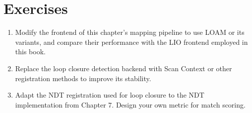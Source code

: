 \section*{Exercises}  
\begin{enumerate}  
	\item Modify the frontend of this chapter's mapping pipeline to use LOAM or its variants, and compare their performance with the LIO frontend employed in this book.  
	\item Replace the loop closure detection backend with Scan Context or other registration methods to improve its stability.  
	\item Adapt the NDT registration used for loop closure to the NDT implementation from Chapter 7. Design your own metric for match scoring.  
\end{enumerate}



